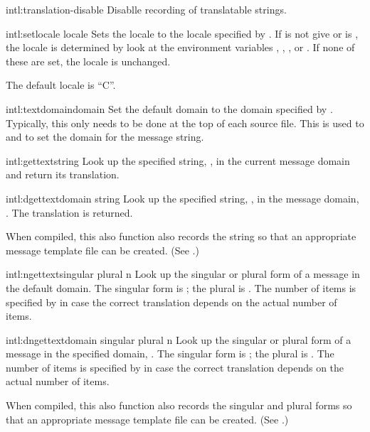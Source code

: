 \begin{defun}{intl:}{translation-disable}{}
  Disablle recording of translatable strings.
\end{defun}

\begin{defun}{intl:}{setlocale}{\ampoptional{} locale}
  Sets the locale to the locale specified by .  If
   is not give or is \nil, the locale is determined by
  look at the environment variables , ,
  , or .  If none of these are set, the
  locale is unchanged.

  The default locale is ``C''.
\end{defun}

\begin{defun}{intl:}{textdomain}{domain}
  Set the default domain to the domain specified by .
  Typically,  this only needs to be done at the top of each source
  file.  This is used to  and  to set the
  domain for the message string.
\end{defun}

\begin{defmac}{intl:}{gettext}{string}
  Look up the specified string, , in the current message
  domain and return its translation.
\end{defmac}

\begin{defun}{intl:}{dgettext}{domain string}
  Look up the specified string, , in the message domain,
  .  The translation is returned.

  When compiled, this also function also records the string so that an
  appropriate message template file can be created.  (See
  .) 
\end{defun}

\begin{defmac}{intl:}{ngettext}{singular plural n}
  Look up the singular or plural form of a message in the default
  domain.  The singular form is ; the plural is
  .  The number of items is specified by  in case
  the correct translation depends on the actual number of items.
\end{defmac}

\begin{defun}{intl:}{dngettext}{domain singular plural n}
  Look up the singular or plural form of a message in the specified
  domain, .  The singular form is ; the
  plural is .  The number of items is specified by 
  in case the correct translation depends on the actual number of
  items.

  When compiled, this also function also records the singular and
  plural forms so that an appropriate message template file can be
  created.  (See .)
\end{defun}

